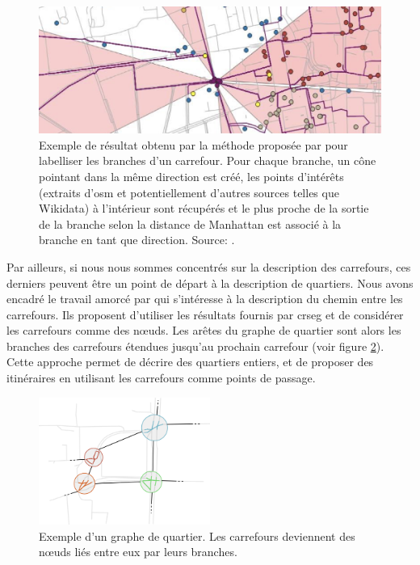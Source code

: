 \begin{figure}[ht]
    \centering
    \includegraphics[width=\textwidth]{images/conclusion/stage_ali.png}
    \caption[Labellisation des branches d'un carrefour]{Exemple de résultat obtenu par la méthode proposée par \citet{aouini2023} pour labelliser les branches d'un carrefour. Pour chaque branche, un cône pointant dans la même direction est créé, les points d'intérêts (extraits d'\gls{osm} et potentiellement d'autres sources telles que Wikidata) à l'intérieur sont récupérés et le plus proche de la sortie de la branche selon la distance de Manhattan est associé à la branche en tant que direction. Source: \citep{aouini2023}.}
    \label{fig:conclusion_exemple_ali}
\end{figure}

\newpar{}

Par ailleurs, si nous nous sommes concentrés sur la description des carrefours, ces derniers peuvent être un point de départ à la description de quartiers. Nous avons encadré le travail amorcé par \citet{guillaumin2023} qui s'intéresse à la description du chemin entre les carrefours. Ils proposent d'utiliser les résultats fournis par crseg et de considérer les carrefours comme des nœuds. Les arêtes du graphe de quartier sont alors les branches des carrefours étendues jusqu'au prochain carrefour (voir figure \ref{fig:conclusion_exemple_chemin_carrefour}). Cette approche permet de décrire des quartiers entiers, et de proposer des itinéraires en utilisant les carrefours comme points de passage.

\begin{figure}[ht]
    \centering
    \includegraphics[width=0.5\textwidth]{images/conclusion/chemin_carrefour.png}
    \caption[Graphe de quartier]{Exemple d'un graphe de quartier. Les carrefours deviennent des nœuds liés entre eux par leurs branches.}
    \label{fig:conclusion_exemple_chemin_carrefour}
\end{figure}


